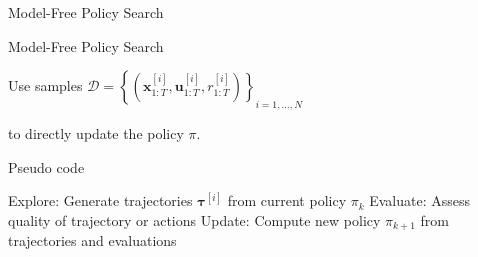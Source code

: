 \documentclass[10pt]{beamer}
\begin{document}
\begin{frame}{Model-Free Policy Search}

\begin{alertblock}{Model-Free Policy Search}

Use samples $ \mathcal{D} = \left\{ \left( \bm{x}_{1:T}^{[i]}, \bm{u}_{1:T}^{[i]}, r_{1:T}^{[i]} \right) \right\}_{i=1,\dots,N}$

to directly update the policy $\pi$.

\end{alertblock}
\vspace{1em}
\begin{exampleblock}{Pseudo code}

\begin{algorithm}  [H]
  \caption{Model free policy search
    \label{}}  
  \begin{algorithmic}[1]  
        \State Explore: Generate trajectories $\bm{\tau}^{[i]}$ from current policy $\pi_k$
        \State Evaluate: Assess quality of trajectory or actions
        \State Update: Compute new policy $\pi_{k+1}$ from trajectories and evaluations
      \EndWhile
  \end{algorithmic}  
\end{algorithm}

\end{exampleblock}

\end{frame}



\end{document}
